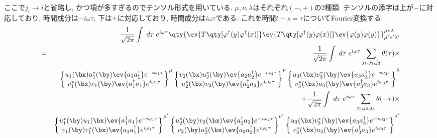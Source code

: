 \documentclass[10.5pt,a4paper]{jreport}
\begin{document}
ここで$j_i\rightarrow i$と省略し, かつ項が多すぎるのでテンソル形式を用いている. $\mu, \nu, \lambda$はそれぞれ$(-, +)$の2種類. テンソルの添字は上が$-$に対応しており, 時間成分は$-i\omega\tau$, 下は$+$に対応しており, 時間成分は$i\omega\tau$である.   これを時間$t-s = \tau$についてFourier変換する:
\begin{eqnarray}
  &&\frac{1}{\sqrt{2\pi}}\int\; d\tau\;e^{i\omega\tau}  \qty{\ev{T\qty[\varphi^\dagger(y)\varphi^\dagger(x)]}\ev{T\qty[\varphi^\dagger(y)\varphi(x)]}\ev{\varphi(y)\varphi(y)}}^{\mu\nu\lambda}_{\mu'\nu'\lambda'}\\
\nonumber  &=& \frac{1}{\sqrt{2\pi}}\int\; d\tau\;e^{i\omega\tau}\sum_{j_1, j_2, j_3}\theta(\tau)\times\\
\nonumber  &&\begin{Bmatrix}
  u_{1}(\bx)u_{1}^*(\by)\ev{a_{1}a_{1}^\dagger}e^{-i\omega_1\tau}\\
  v_{1}^*(\bx)v_{1}(\by)\ev{a_{1}^\dagger a_{1}}e^{i\omega_1\tau}
\end{Bmatrix}^\mu
\begin{Bmatrix}
    v_{2}(\bx)u^*_{2}(\by)\ev{a_{2}a_{2}^\dagger}e^{-i\omega_2\tau}\\
  u^*_{2}(\bx)v_{2}(\by)\ev{a_{2}^\dagger a_{2}}e^{i\omega_2\tau}
\end{Bmatrix}^\nu
\begin{Bmatrix}
  u_{3}(\bx)v^*_{3}(\by)\ev{a_{3}a^\dagger_{3}}e^{-i\omega_3\tau}\\
  v_{3}^*(\bx)u_{3}(\by)\ev{a_{3}^\dagger a_{3}}e^{i\omega_3\tau}
\end{Bmatrix}^\lambda\\
\nonumber  &&+ \frac{1}{\sqrt{2\pi}}\int\; d\tau\;e^{i\omega\tau}\sum_{j_1, j_2, j_3}\theta(-\tau)\times\\
\nonumber  &&\begin{Bmatrix}
    u_{1}^*(\by)u_{1}(\bx)\ev{a_{1}^\dagger a_{1}}e^{-i\omega_1\tau}\\
    v_{1}(\by)v_{1}^*(\bx)\ev{a_{1}a_{1}^\dagger}e^{i\omega_1\tau}
  \end{Bmatrix}^{\mu'}
  \begin{Bmatrix}
    u^*_{2}(\by)v_{2}(\bx)\ev{a_{2}^\dagger a_{2}}e^{-i\omega_2\tau}\\
    v_{2}(\by)u^*_{2}(\bx)\ev{a_{2}a_{2}^\dagger}e^{i\omega_2\tau}
  \end{Bmatrix}^{\nu'}
  \begin{Bmatrix}
    u_{3}(\bx)v^*_{3}(\by)\ev{a_{3}a^\dagger_{3}}e^{-i\omega_3\tau}\\
    v_{3}^*(\bx)u_{3}(\by)\ev{a_{3}^\dagger a_{3}}e^{i\omega_3\tau}
  \end{Bmatrix}^{\lambda'}\\
\end{eqnarray}
\end{document}
